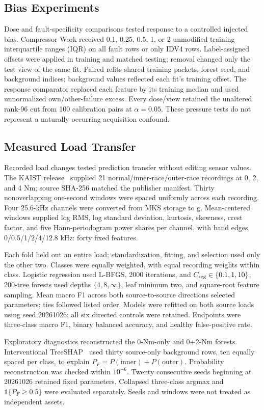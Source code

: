 \documentclass[conference]{IEEEtran}
\begin{document}
\subsection{Bias Experiments}
Dose and fault-specificity comparisons tested response to a controlled injected bias. Compressor Work received 0.1, 0.25, 0.5, 1, or 2 unmodified training interquartile ranges (IQR) on all fault rows or only IDV4 rows. Label-assigned offsets were applied in training and matched testing; removal changed only the test view of the same fit. Paired refits shared training packets, forest seed, and background indices; background values reflected each fit's training offset. The response comparator replaced each feature by its training median and used unnormalized own/other-failure excess. Every dose/view retained the unaltered rank-96 cut from 100 calibration pairs at $\alpha=0.05$. These pressure tests do not represent a naturally occurring acquisition confound.

\subsection{Measured Load Transfer}
Recorded load changes tested prediction transfer without editing sensor values. The KAIST release~\cite{jung2023load} supplied 21 normal/inner-race/outer-race recordings at 0, 2, and 4 Nm; source SHA-256 matched the publisher manifest. Thirty nonoverlapping one-second windows were spaced uniformly across each recording. Four 25.6-kHz channels were converted from MKS storage to g. Mean-centered windows supplied log RMS, log standard deviation, kurtosis, skewness, crest factor, and five Hann-periodogram power shares per channel, with band edges 0/0.5/1/2/4/12.8 kHz: forty fixed features.

Each fold held out an entire load; standardization, fitting, and selection used only the other two. Classes were equally weighted, with equal recording weights within class. Logistic regression used L-BFGS, 2000 iterations, and $C_{\rm reg}\in\{0.1,1,10\}$; 200-tree forests used depths $\{4,8,\infty\}$, leaf minimum two, and square-root feature sampling. Mean macro F1 across both source-to-source directions selected parameters; ties followed listed order. Models were refitted on both source loads using seed 20261026; all six directed controls were retained. Endpoints were three-class macro F1, binary balanced accuracy, and healthy false-positive rate.

Exploratory diagnostics reconstructed the 0-Nm-only and 0+2-Nm forests. Interventional TreeSHAP~\cite{lundberg2020trees} used thirty source-only background rows, ten equally spaced per class, to explain $P_F=P(\mathrm{inner})+P(\mathrm{outer})$. Probability reconstruction was checked within $10^{-6}$. Twenty consecutive seeds beginning at 20261026 retained fixed parameters. Collapsed three-class argmax and $\mathbb{1}\{P_F\geq0.5\}$ were evaluated separately. Seeds and windows were not treated as independent assets.
\end{document}
